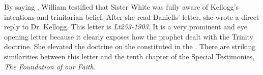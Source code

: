 By saying , William testified that Sister White was fully aware of Kellogg's intentions and trinitarian belief. After she read Daniells’ letter, she wrote a direct reply to Dr. Kellogg. This letter is \textit{Lt253-1903}. It is a very prominent and eye opening letter because it clearly exposes how the prophet dealt with the Trinity doctrine. She elevated the doctrine on the  constituted in the . There are striking similarities between this letter and the tenth chapter of the Special Testimonies, \textit{The Foundation of our Faith}.

